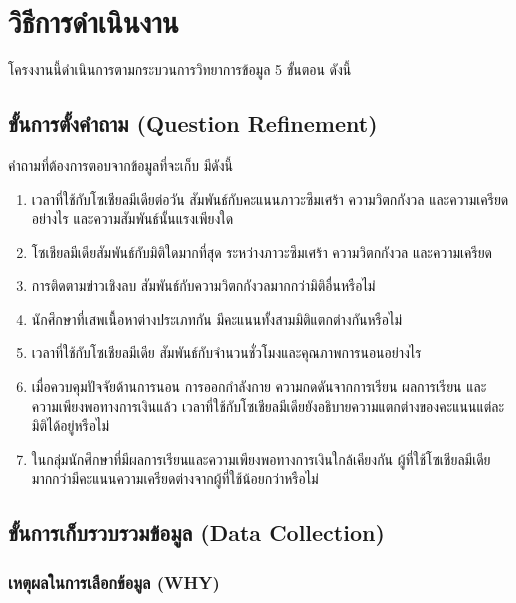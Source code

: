 \section{วิธีการดำเนินงาน}


โครงงานนี้ดำเนินการตามกระบวนการวิทยาการข้อมูล 5 ขั้นตอน ดังนี้

\subsection{ขั้นการตั้งคำถาม (Question Refinement)}

คำถามที่ต้องการตอบจากข้อมูลที่จะเก็บ มีดังนี้

\begin{enumerate}[label=\arabic*),leftmargin=1.9cm,itemsep=0.15em,topsep=0.2em]
    \item เวลาที่ใช้กับโซเชียลมีเดียต่อวัน สัมพันธ์กับคะแนนภาวะซึมเศร้า ความวิตกกังวล และความเครียดอย่างไร และความสัมพันธ์นั้นแรงเพียงใด
    \item โซเชียลมีเดียสัมพันธ์กับมิติใดมากที่สุด ระหว่างภาวะซึมเศร้า ความวิตกกังวล และความเครียด
    \item การติดตามข่าวเชิงลบ สัมพันธ์กับความวิตกกังวลมากกว่ามิติอื่นหรือไม่
    \item นักศึกษาที่เสพเนื้อหาต่างประเภทกัน มีคะแนนทั้งสามมิติแตกต่างกันหรือไม่
    \item เวลาที่ใช้กับโซเชียลมีเดีย สัมพันธ์กับจำนวนชั่วโมงและคุณภาพการนอนอย่างไร
    \item เมื่อควบคุมปัจจัยด้านการนอน การออกกำลังกาย ความกดดันจากการเรียน ผลการเรียน และความเพียงพอทางการเงินแล้ว เวลาที่ใช้กับโซเชียลมีเดียยังอธิบายความแตกต่างของคะแนนแต่ละมิติได้อยู่หรือไม่
    \item ในกลุ่มนักศึกษาที่มีผลการเรียนและความเพียงพอทางการเงินใกล้เคียงกัน ผู้ที่ใช้โซเชียลมีเดียมากกว่ามีคะแนนความเครียดต่างจากผู้ที่ใช้น้อยกว่าหรือไม่
\end{enumerate}

\subsection{ขั้นการเก็บรวบรวมข้อมูล (Data Collection)}

\subsubsection*{เหตุผลในการเลือกข้อมูล (WHY)}

